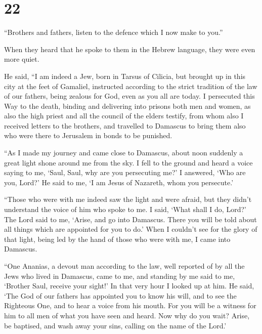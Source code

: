 \hypertarget{section-21}{%
\section{22}\label{section-21}}

 ``Brothers and fathers, listen to the defence which I now
make to you.''

 When they heard that he spoke to them in the Hebrew
language, they were even more quiet.

He said,  ``I am indeed a Jew, born in Tarsus of Cilicia,
but brought up in this city at the feet of Gamaliel, instructed
according to the strict tradition of the law of our fathers, being
zealous for God, even as you all are today.  I persecuted
this Way to the death, binding and delivering into prisons both men and
women,  as also the high priest and all the council of the
elders testify, from whom also I received letters to the brothers, and
travelled to Damascus to bring them also who were there to Jerusalem in
bonds to be punished.

 ``As I made my journey and came close to Damascus, about
noon suddenly a great light shone around me from the sky.  I
fell to the ground and heard a voice saying to me, `Saul, Saul, why are
you persecuting me?'  I answered, `Who are you, Lord?' He
said to me, `I am Jesus of Nazareth, whom you persecute.'

 ``Those who were with me indeed saw the light and were
afraid, but they didn't understand the voice of him who spoke to me.
 I said, `What shall I do, Lord?' The Lord said to me,
`Arise, and go into Damascus. There you will be told about all things
which are appointed for you to do.'  When I couldn't see
for the glory of that light, being led by the hand of those who were
with me, I came into Damascus.

 ``One Ananias, a devout man according to the law, well
reported of by all the Jews who lived in Damascus,  came to
me, and standing by me said to me, `Brother Saul, receive your sight!'
In that very hour I looked up at him.  He said, `The God of
our fathers has appointed you to know his will, and to see the Righteous
One, and to hear a voice from his mouth.  For you will be a
witness for him to all men of what you have seen and heard.
 Now why do you wait? Arise, be baptised, and wash away
your sins, calling on the name of the Lord.'

